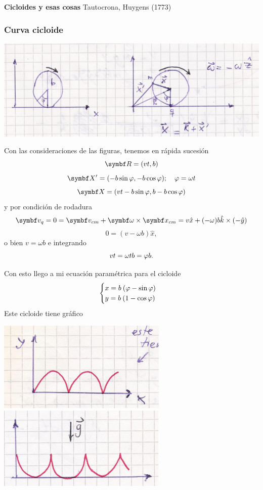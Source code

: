 \documentclass[10pt,oneside]{CBFT_book}
\begin{document}
\begin{ejemplo}{\bf Cicloides y esas cosas}
Tautocrona, Huygens (1773)

\subsubsection*{Curva cicloide}

\includegraphics[scale=0.3]{images/fig_mc_cicloides.jpg}

Con las consideraciones de las figuras, tenemos en rápida sucesión
\[
	\vb{R} = (vt,b)
\]
\[
	\vb{X}' = ( -b \sin \vp, -b \cos \vp ) ; \quad \vp = \omega t
\]
\[
	\vb{X} = ( vt -b \sin \vp, b -b \cos \vp )
\]
y por condición de rodadura
\[
	\vb{v}_q = 0 = \vb{v}_{cm} + \vb{\omega} \times \vb{x}_{cm} = v\hat{x} + (-\omega)b\hat{k} \times (-\hat{y})
\]
\[
	0 = (v-\omega b)\hat{x},
\]
o bien $v=\omega b$ e integrando
\[
	vt = \omega t b = \varphi b.
\]

Con esto llego a mi ecuación paramétrica para el cicloide
\[
	\begin{cases}  x = b \: (\varphi - \sin \varphi )\\
		       y = b \: (1 - \cos \varphi )
	\end{cases}
\]
Este cicloide tiene gráfico 

\includegraphics[scale=0.2]{images/fig_mc_cicloide_tiny.jpg}
\includegraphics[scale=0.2]{images/fig_mc_cicloide_tiny_inverted.jpg}


\end{ejemplo}
\end{document}
